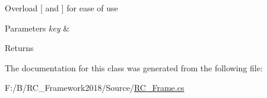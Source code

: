 Overload \mbox{[} and \mbox{]} for ease of use 


\begin{DoxyParams}{Parameters}
{\em key} & \\
\hline
\end{DoxyParams}
\begin{DoxyReturn}{Returns}

\end{DoxyReturn}


The documentation for this class was generated from the following file\+:\begin{DoxyCompactItemize}
\item 
F\+:/\+B/\+R\+C\+\_\+\+Framework2018/\+Source/\mbox{\hyperlink{_r_c___frame_8cs}{R\+C\+\_\+\+Frame.\+cs}}\end{DoxyCompactItemize}
